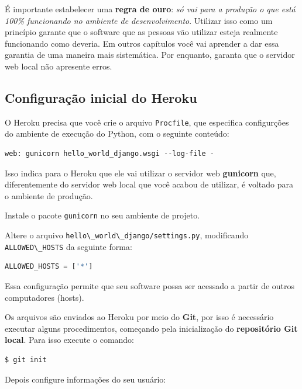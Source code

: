 \documentclass[brazil,a4paper,oneside,openright,parskip=full]{book}
\newcommand{\passthrough}[1]{#1}
\begin{document}
É importante estabelecer uma \textbf{regra de ouro}: \emph{só vai para a
produção o que está 100\% funcionando no ambiente de desenvolvimento}.
Utilizar isso como um princípio garante que o software que as pessoas
vão utilizar esteja realmente funcionando como deveria. Em outros
capítulos você vai aprender a dar essa garantia de uma maneira mais
sistemática. Por enquanto, garanta que o servidor web local não
apresente erros.

\hypertarget{configurauxe7uxe3o-inicial-do-heroku}{%
\subsection{Configuração inicial do
Heroku}\label{configurauxe7uxe3o-inicial-do-heroku}}

O Heroku precisa que você crie o arquivo
\passthrough{\lstinline!Procfile!}, que especifica configurções do
ambiente de execução do Python, com o seguinte conteúdo:

\begin{lstlisting}[style=nonumber]
web: gunicorn hello_world_django.wsgi --log-file -
\end{lstlisting}

Isso indica para o Heroku que ele vai utilizar o servidor web
\textbf{gunicorn} que, diferentemente do servidor web local que você
acabou de utilizar, é voltado para o ambiente de produção.

Instale o pacote \passthrough{\lstinline!gunicorn!} no seu ambiente de
projeto.

Altere o arquivo
\passthrough{\lstinline!hello\_world\_django/settings.py!}, modificando
\passthrough{\lstinline!ALLOWED\_HOSTS!} da seguinte forma:

\begin{lstlisting}[language=Python, style=nonumber]
ALLOWED_HOSTS = ['*']
\end{lstlisting}

Essa configuração permite que seu software possa ser acessado a partir
de outros computadores (hosts).

Os arquivos são enviados ao Heroku por meio do \textbf{Git}, por isso é
necessário executar alguns procedimentos, começando pela inicialização
do \textbf{repositório Git local}. Para isso execute o comando:

\begin{lstlisting}[language=sh, style=nonumber]
$ git init
\end{lstlisting}

Depois configure informações do seu usuário:
\end{document}
